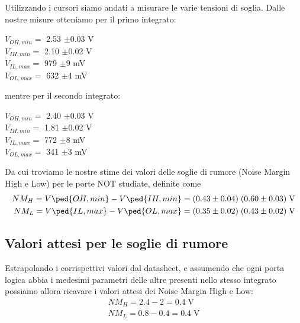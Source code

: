 \documentclass[10pt, a4paper, italian]{article}
\begin{document}
Utilizzando i cursori siamo andati a misurare le varie tensioni di soglia.
Dalle nostre misure otteniamo per il primo integrato:
\begin{multicols}{2}
    \centering
    $V_{OH,min}=$ 2.53 $\pm$0.03 V\\
    $V_{IH,min}=$ 2.10 $\pm$0.02 V\\
    
    $V_{IL,max}=$ 979 $\pm$9 mV\\
    $V_{OL,max}=$ 632 $\pm$4 mV\\
\end{multicols}
mentre per il secondo integrato:

\begin{multicols}{2}
    \centering
    $V_{OH,min}=$ 2.40 $\pm$0.03 V\\
    $V_{IH,min}=$ 1.81 $\pm$0.02 V\\
    
    $V_{IL,max}=$ 772 $\pm$8 mV\\
    $V_{OL,max}=$ 341 $\pm$3 mV\\
\end{multicols}

Da cui troviamo le nostre stime dei valori delle soglie di rumore (Noise
Margin High e Low) per le porte NOT studiate, definite come
\begin{align*}
    NM_H = V\ped{OH, min} - V\ped{IH, min} = (0.43 \pm 0.04) \;
    (0.60 \pm 0.03) \; \si{\V} \\
    NM_L = V\ped{IL, max} - V\ped{OL, max} = (0.35 \pm 0.02) \;
    (0.43 \pm 0.02) \; \si{\V}
\end{align*}

\subsection{Valori attesi per le soglie di rumore}
Estrapolando i corrispettivi valori dal datasheet, e assumendo che ogni porta
logica abbia i medesimi parametri delle altre presenti nello stesso integrato
possiamo allora ricavare i valori attesi dei Noise Margin High e Low:
\begin{align*}
NM_H = 2.4 - 2 = 0.4 \; \si{\V} \\
NM_L = 0.8 - 0.4 = 0.4 \; \si{\V}
\end{align*}
\end{document}
